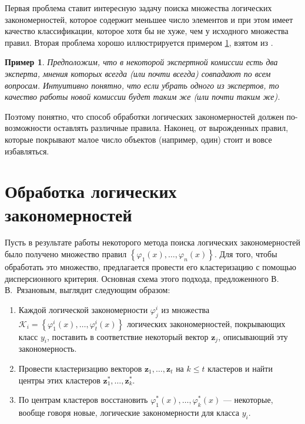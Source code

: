 \documentclass[12pt]{article}
\newtheorem{example}{Пример}
\begin{document}
Первая проблема ставит интересную задачу поиска множества логических
закономерностей, которое содержит меньшее число элементов и при этом
имеет качество классификации, которое хотя бы не хуже, чем у исходного
множества правил. Вторая проблема хорошо иллюстрируется примером
\ref{ex:same:experts}, взятом из \cite{voron10logicalgs}.

\begin{example}\label{ex:same:experts}
  Предположим, что в некоторой экспертной комиссии есть два эксперта,
  мнения которых всегда (или почти всегда) совпадают по всем
  вопросам. Интуитивно понятно, что если убрать одного из экспертов,
  то качество работы новой комиссии будет таким же (или почти таким
  же).
\end{example}

Поэтому понятно, что способ обработки логических закономерностей
должен по-возможности оставлять различные правила. Наконец, от
вырожденных правил, которые покрывают малое число объектов (например,
один) стоит и вовсе избавляться.

\section{Обработка логических закономерностей}
\label{sec:processing}


Пусть в результате работы некоторого метода поиска логических
закономерностей было получено множество правил \(\left\{\varphi_1(x),
\dots, \varphi_n(x)\right\}\). Для того, чтобы обработать это
множество, предлагается провести его кластеризацию с помощью
дисперсионного критерия. Основная схема этого подхода, предложенного
В.\,В.~Рязановым, выглядит следующим образом:

\begin{enumerate}
\item Каждой логической закономерности \(\varphi_j^i\) из множества
  \(
  \mathcal{K}_{i} = \left\{
  \varphi_1^i(x), \dots, \varphi_t^i(x)
  \right\}
  \)
  логических закономерностей, покрывающих класс \(y_i\), поставить в
  соответствие некоторый вектор \(\bm{z}_j\), описывающий эту
  закономерность.
\item Провести кластеризацию векторов \(\bm{z}_1, \dots, \bm{z}_t\) на
  \(k \leq t\) кластеров и найти центры этих кластеров
  \(\bm{z}_1^*, \dots, \bm{z}_k^*\).
\item По центрам кластеров восстановить \(\varphi_1^*(x), \dots,
  \varphi_k^*(x)\) --- некоторые, вообще говоря новые, логические
  закономерности для класса \(y_i\).
\end{enumerate}
\end{document}

